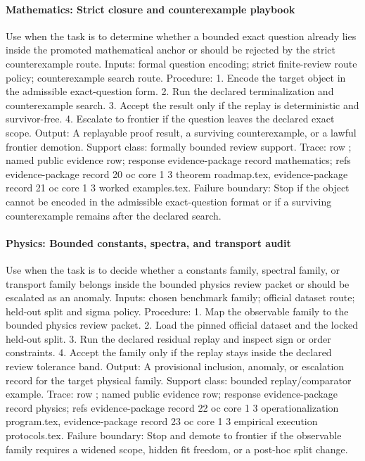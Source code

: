 \paragraph{Mathematics: Strict closure and counterexample playbook}
Use when the task is to determine whether a bounded exact question already lies inside the promoted mathematical anchor or should be rejected by the strict counterexample route.
Inputs: formal question encoding; \allowbreak strict finite-review route policy; \allowbreak counterexample search route.
Procedure: 1. Encode the target object in the admissible exact-question form. 2. Run the declared terminalization and counterexample search. 3. Accept the result only if the replay is deterministic and survivor-free. 4. Escalate to frontier if the question leaves the declared exact scope.
Output: A replayable proof result, a surviving counterexample, or a lawful frontier demotion.
Support class: formally bounded review support.
Trace: row ; named public evidence row; \allowbreak response evidence-package record mathematics; \allowbreak refs evidence-package record 20 oc core 1 3 theorem roadmap.tex, \allowbreak evidence-package record 21 oc core 1 3 worked examples.tex.
Failure boundary: Stop if the object cannot be encoded in the admissible exact-question format or if a surviving counterexample remains after the declared search.

\paragraph{Physics: Bounded constants, spectra, and transport audit}
Use when the task is to decide whether a constants family, spectral family, or transport family belongs inside the bounded physics review packet or should be escalated as an anomaly.
Inputs: chosen benchmark family; \allowbreak official dataset route; \allowbreak held-out split and sigma policy.
Procedure: 1. Map the observable family to the bounded physics review packet. 2. Load the pinned official dataset and the locked held-out split. 3. Run the declared residual replay and inspect sign or order constraints. 4. Accept the family only if the replay stays inside the declared review tolerance band.
Output: A provisional inclusion, anomaly, or escalation record for the target physical family.
Support class: bounded replay/comparator example.
Trace: row ; named public evidence row; \allowbreak response evidence-package record physics; \allowbreak refs evidence-package record 22 oc core 1 3 operationalization program.tex, \allowbreak evidence-package record 23 oc core 1 3 empirical execution protocols.tex.
Failure boundary: Stop and demote to frontier if the observable family requires a widened scope, hidden fit freedom, or a post-hoc split change.

